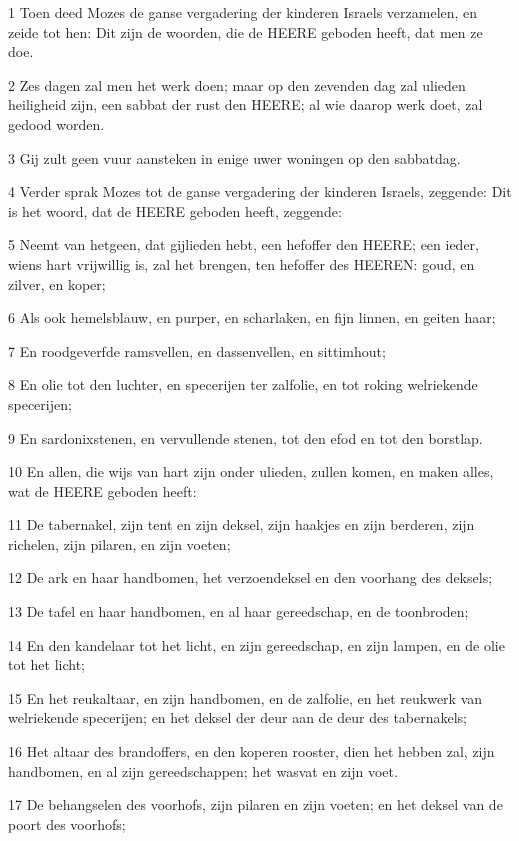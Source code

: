\par 1 Toen deed Mozes de ganse vergadering der kinderen Israels verzamelen, en zeide tot hen: Dit zijn de woorden, die de HEERE geboden heeft, dat men ze doe.
\par 2 Zes dagen zal men het werk doen; maar op den zevenden dag zal ulieden heiligheid zijn, een sabbat der rust den HEERE; al wie daarop werk doet, zal gedood worden.
\par 3 Gij zult geen vuur aansteken in enige uwer woningen op den sabbatdag.
\par 4 Verder sprak Mozes tot de ganse vergadering der kinderen Israels, zeggende: Dit is het woord, dat de HEERE geboden heeft, zeggende:
\par 5 Neemt van hetgeen, dat gijlieden hebt, een hefoffer den HEERE; een ieder, wiens hart vrijwillig is, zal het brengen, ten hefoffer des HEEREN: goud, en zilver, en koper;
\par 6 Als ook hemelsblauw, en purper, en scharlaken, en fijn linnen, en geiten haar;
\par 7 En roodgeverfde ramsvellen, en dassenvellen, en sittimhout;
\par 8 En olie tot den luchter, en specerijen ter zalfolie, en tot roking welriekende specerijen;
\par 9 En sardonixstenen, en vervullende stenen, tot den efod en tot den borstlap.
\par 10 En allen, die wijs van hart zijn onder ulieden, zullen komen, en maken alles, wat de HEERE geboden heeft:
\par 11 De tabernakel, zijn tent en zijn deksel, zijn haakjes en zijn berderen, zijn richelen, zijn pilaren, en zijn voeten;
\par 12 De ark en haar handbomen, het verzoendeksel en den voorhang des deksels;
\par 13 De tafel en haar handbomen, en al haar gereedschap, en de toonbroden;
\par 14 En den kandelaar tot het licht, en zijn gereedschap, en zijn lampen, en de olie tot het licht;
\par 15 En het reukaltaar, en zijn handbomen, en de zalfolie, en het reukwerk van welriekende specerijen; en het deksel der deur aan de deur des tabernakels;
\par 16 Het altaar des brandoffers, en den koperen rooster, dien het hebben zal, zijn handbomen, en al zijn gereedschappen; het wasvat en zijn voet.
\par 17 De behangselen des voorhofs, zijn pilaren en zijn voeten; en het deksel van de poort des voorhofs;
